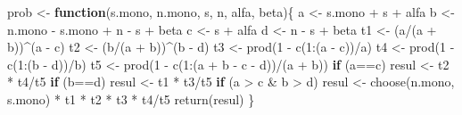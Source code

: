 \documentclass[
  10pt,
  spanish,
]{book}
\newenvironment{Shaded}{\begin{snugshade}}{\end{snugshade}}
\newcommand{\ControlFlowTok}[1]{\textcolor[rgb]{0.13,0.29,0.53}{\textbf{#1}}}
\newcommand{\DecValTok}[1]{\textcolor[rgb]{0.00,0.00,0.81}{#1}}
\newcommand{\FunctionTok}[1]{\textcolor[rgb]{0.00,0.00,0.00}{#1}}
\newcommand{\NormalTok}[1]{#1}
\newcommand{\OtherTok}[1]{\textcolor[rgb]{0.56,0.35,0.01}{#1}}
\newcommand{\SpecialCharTok}[1]{\textcolor[rgb]{0.00,0.00,0.00}{#1}}
\theoremstyle{definition}
\theoremstyle{definition}
\theoremstyle{definition}
\theoremstyle{definition}
\theoremstyle{remark}
\begin{document}
\begin{Shaded}
\begin{Highlighting}[]
\NormalTok{prob }\OtherTok{\textless{}{-}} \ControlFlowTok{function}\NormalTok{(s.mono, n.mono, s, n, alfa, beta)\{}
\NormalTok{  a }\OtherTok{\textless{}{-}}\NormalTok{ s.mono }\SpecialCharTok{+}\NormalTok{ s }\SpecialCharTok{+}\NormalTok{ alfa}
\NormalTok{  b }\OtherTok{\textless{}{-}}\NormalTok{ n.mono }\SpecialCharTok{{-}}\NormalTok{ s.mono }\SpecialCharTok{+}\NormalTok{ n }\SpecialCharTok{{-}}\NormalTok{ s }\SpecialCharTok{+}\NormalTok{ beta }
\NormalTok{  c }\OtherTok{\textless{}{-}}\NormalTok{ s }\SpecialCharTok{+}\NormalTok{ alfa}
\NormalTok{  d }\OtherTok{\textless{}{-}}\NormalTok{ n }\SpecialCharTok{{-}}\NormalTok{ s }\SpecialCharTok{+}\NormalTok{ beta}
\NormalTok{  t1 }\OtherTok{\textless{}{-}}\NormalTok{ (a}\SpecialCharTok{/}\NormalTok{(a }\SpecialCharTok{+}\NormalTok{ b))}\SpecialCharTok{\^{}}\NormalTok{(a }\SpecialCharTok{{-}}\NormalTok{ c)}
\NormalTok{  t2 }\OtherTok{\textless{}{-}}\NormalTok{ (b}\SpecialCharTok{/}\NormalTok{(a }\SpecialCharTok{+}\NormalTok{ b))}\SpecialCharTok{\^{}}\NormalTok{(b }\SpecialCharTok{{-}}\NormalTok{ d) }
\NormalTok{  t3 }\OtherTok{\textless{}{-}} \FunctionTok{prod}\NormalTok{(}\DecValTok{1} \SpecialCharTok{{-}} \FunctionTok{c}\NormalTok{(}\DecValTok{1}\SpecialCharTok{:}\NormalTok{(a }\SpecialCharTok{{-}}\NormalTok{ c))}\SpecialCharTok{/}\NormalTok{a)}
\NormalTok{  t4 }\OtherTok{\textless{}{-}} \FunctionTok{prod}\NormalTok{(}\DecValTok{1} \SpecialCharTok{{-}} \FunctionTok{c}\NormalTok{(}\DecValTok{1}\SpecialCharTok{:}\NormalTok{(b }\SpecialCharTok{{-}}\NormalTok{ d))}\SpecialCharTok{/}\NormalTok{b) }
\NormalTok{  t5 }\OtherTok{\textless{}{-}} \FunctionTok{prod}\NormalTok{(}\DecValTok{1} \SpecialCharTok{{-}} \FunctionTok{c}\NormalTok{(}\DecValTok{1}\SpecialCharTok{:}\NormalTok{(a }\SpecialCharTok{+}\NormalTok{ b }\SpecialCharTok{{-}}\NormalTok{ c }\SpecialCharTok{{-}}\NormalTok{ d))}\SpecialCharTok{/}\NormalTok{(a }\SpecialCharTok{+}\NormalTok{ b))}
  \ControlFlowTok{if}\NormalTok{ (a}\SpecialCharTok{==}\NormalTok{c) }
\NormalTok{    resul }\OtherTok{\textless{}{-}}\NormalTok{ t2 }\SpecialCharTok{*}\NormalTok{ t4}\SpecialCharTok{/}\NormalTok{t5 }
  \ControlFlowTok{if}\NormalTok{ (b}\SpecialCharTok{==}\NormalTok{d)}
\NormalTok{    resul }\OtherTok{\textless{}{-}}\NormalTok{ t1 }\SpecialCharTok{*}\NormalTok{ t3}\SpecialCharTok{/}\NormalTok{t5}
  \ControlFlowTok{if}\NormalTok{ (a }\SpecialCharTok{\textgreater{}}\NormalTok{ c }\SpecialCharTok{\&}\NormalTok{ b }\SpecialCharTok{\textgreater{}}\NormalTok{ d)}
\NormalTok{    resul }\OtherTok{\textless{}{-}} \FunctionTok{choose}\NormalTok{(n.mono, s.mono) }\SpecialCharTok{*}\NormalTok{ t1 }\SpecialCharTok{*}\NormalTok{ t2 }\SpecialCharTok{*}\NormalTok{ t3 }\SpecialCharTok{*}\NormalTok{ t4}\SpecialCharTok{/}\NormalTok{t5}
  \FunctionTok{return}\NormalTok{(resul) }
\NormalTok{  \}}
\end{Highlighting}
\end{Shaded}
\end{document}
